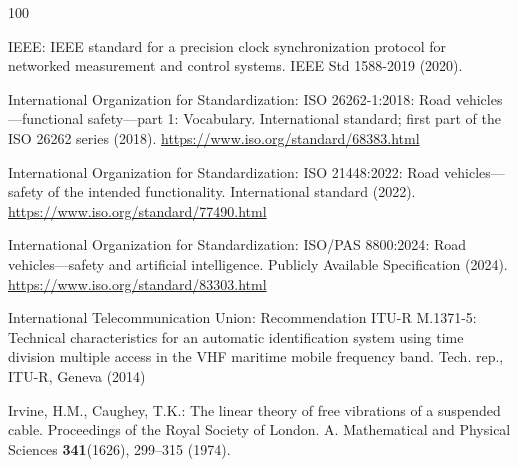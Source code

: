 \documentclass[graybox,envcountchap]{style/SNmono}
\begin{document}
\begin{thebibliography}{100}
{\par}

{IEEE}: {IEEE} standard for a precision clock synchronization protocol for
  networked measurement and control systems.
\newblock IEEE Std 1588-2019 (2020).
\newblock {}


{\color{blue} 
{International Organization for Standardization}: {ISO 26262-1:2018}: Road
  vehicles---functional safety---part 1: Vocabulary.
\newblock International standard; first part of the ISO 26262 series (2018).
\newblock \urlprefix\url{https://www.iso.org/standard/68383.html}

\par}
{\color{blue} 
{International Organization for Standardization}: {ISO 21448:2022}: Road
  vehicles---safety of the intended functionality.
\newblock International standard (2022).
\newblock \urlprefix\url{https://www.iso.org/standard/77490.html}

\par}
{\color{blue} 
{International Organization for Standardization}: {ISO/PAS 8800:2024}: Road
  vehicles---safety and artificial intelligence.
\newblock Publicly Available Specification (2024).
\newblock \urlprefix\url{https://www.iso.org/standard/83303.html}

\par}
{\color{red} 
{International Telecommunication Union}: Recommendation {ITU-R} {M}.1371-5:
  Technical characteristics for an automatic identification system using time
  division multiple access in the {VHF} maritime mobile frequency band.
\newblock Tech. rep., ITU-R, Geneva (2014)

\par}

Irvine, H.M., Caughey, T.K.: The linear theory of free vibrations of a
  suspended cable.
\newblock Proceedings of the Royal Society of London. A. Mathematical and
  Physical Sciences \textbf{341}(1626), 299--315 (1974).
\newblock {}



\end{thebibliography}
\end{document}

